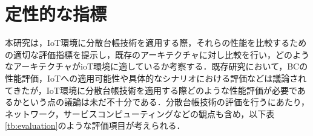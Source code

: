 \documentclass[japanese, macos]{KU2}
\begin{document}
\chapter{定性的な指標}
本研究は，IoT環境に分散台帳技術を適用する際，それらの性能を比較するための適切な評価指標を提示し，既存のアーキテクチャに対し比較を行い，どのようなアーキテクチャがioT環境に適しているか考察する．既存研究において，BCの性能評価，IoTへの適用可能性や具体的なシナリオにおける評価などは議論されてきたが，IoT環境に分散台帳技術を適用する際どのような性能評価が必要であるかという点の議論は未だ不十分である．分散台帳技術の評価を行うにあたり，ネットワーク，サービスコンピューティングなどの観点も含め，以下表\ref{tb:evaluation}のような評価項目が考えられる．

\begin{table}[t]
    \begin{center}
\end{center}
\end{table}
\end{document}
